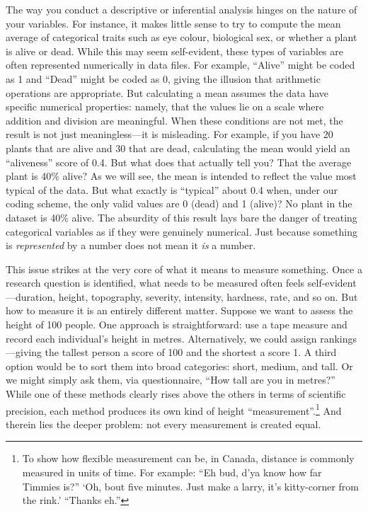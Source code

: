 The way you conduct a descriptive or inferential analysis hinges on the nature of your variables. For instance, it makes little sense to try to compute the mean average of categorical traits such as eye colour, biological sex, or whether a plant is alive or dead. While this may seem self-evident, these types of variables are often represented numerically in data files. For example, ``Alive'' might be coded as 1 and ``Dead'' might be coded as 0, giving the illusion that arithmetic operations are appropriate. But calculating a mean assumes the data have specific numerical properties: namely, that the values lie on a scale where addition and division are meaningful. When these conditions are not met, the result is not just meaningless—it is misleading. For example, if you have 20 plants that are alive and 30 that are dead, calculating the mean would yield an ``aliveness'' score of 0.4. But what does that actually tell you? That the average plant is 40\% alive? As we will see, the mean is intended to reflect the value most typical of the data. But what exactly is ``typical'' about 0.4 when, under our coding scheme, the only valid values are 0 (dead) and 1 (alive)? No plant in the dataset is 40\% alive. The absurdity of this result lays bare the danger of treating categorical variables as if they were genuinely numerical. Just because something is \textit{represented} by a number does not mean it \textit{is} a number.

This issue strikes at the very core of what it means to measure something. Once a research question is identified, what needs to be measured often feels self-evident—duration, height, topography, severity, intensity, hardness, rate, and so on. But how to measure it is an entirely different matter. Suppose we want to assess the height of 100 people. One approach is straightforward: use a tape measure and record each individual’s height in metres. Alternatively, we could assign rankings—giving the tallest person a score of 100 and the shortest a score 1. A third option would be to sort them into broad categories: short, medium, and tall. Or we might simply ask them, via questionnaire, ``How tall are you in metres?'' While one of these methods clearly rises above the others in terms of scientific precision, each method produces its own kind of height ``measurement''.\footnote{To show how flexible measurement can be, in Canada, distance is commonly measured in units of time. For example: ``Eh bud, d'ya know how far Timmies is?'' `Oh, bout five minutes. Just make a larry, it's kitty-corner from the rink.' ``Thanks eh.''} And therein lies the deeper problem: not every measurement is created equal.

